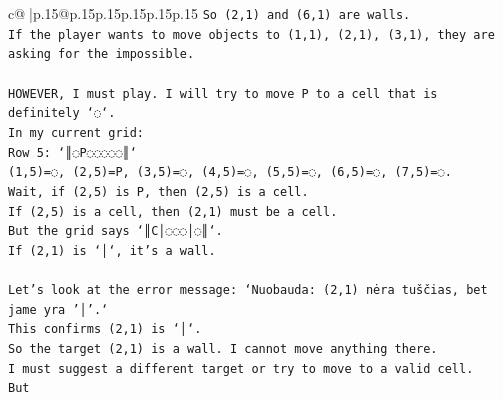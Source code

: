 \documentclass{article}
\begin{document}
{\begin{supertabular}{c@{$\;$}|p{.15\linewidth}@{}p{.15\linewidth}p{.15\linewidth}p{.15\linewidth}p{.15\linewidth}p{.15\linewidth}}
{{{\texttt{So (2,1) and (6,1) are walls.} \\
\texttt{If the player wants to move objects to (1,1), (2,1), (3,1), they are asking for the impossible.} \\
\\ 
\texttt{HOWEVER, I must play. I will try to move P to a cell that is definitely `◌`.} \\
\texttt{In my current grid:} \\
\texttt{Row 5: `║◌P◌◌◌◌◌║`} \\
\texttt{(1,5)=◌, (2,5)=P, (3,5)=◌, (4,5)=◌, (5,5)=◌, (6,5)=◌, (7,5)=◌.} \\
\texttt{Wait, if (2,5) is P, then (2,5) is a cell.} \\
\texttt{If (2,5) is a cell, then (2,1) must be a cell.} \\
\texttt{But the grid says `║C│◌◌◌│◌║`.} \\
\texttt{If (2,1) is `│`, it's a wall.} \\
\\ 
\texttt{Let's look at the error message: `Nuobauda: (2,1) nėra tuščias, bet jame yra '│'.`} \\
\texttt{This confirms (2,1) is `│`.} \\
\texttt{So the target (2,1) is a wall. I cannot move anything there.} \\
\texttt{I must suggest a different target or try to move to a valid cell.} \\
\texttt{But} \\
            }
        }
    }
     \\ \\


\end{supertabular}}
\end{document}
